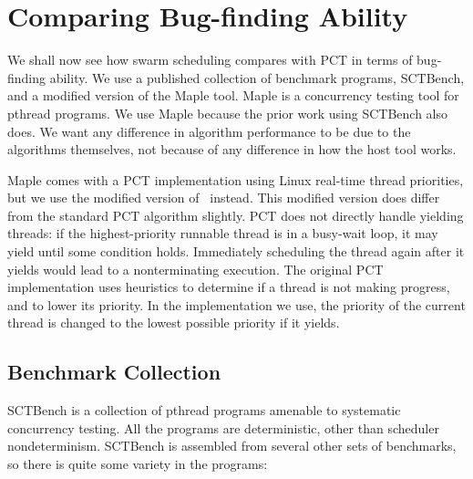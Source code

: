 \section{Comparing Bug-finding Ability}
\label{sec:algorithms-eval}

We shall now see how swarm scheduling compares with PCT in terms of bug-finding
ability.  We use a published collection of benchmark programs,
SCTBench\cite{thomson2016,thomson2014}, and a modified version of the Maple
tool\cite{yu2012}.  Maple is a concurrency testing tool for pthread programs.
We use Maple because the prior work using SCTBench also does.  We want any
difference in algorithm performance to be due to the algorithms themselves, not
because of any difference in how the host tool works.

Maple comes with a PCT implementation using Linux real-time thread priorities,
but we use the modified version of~\cite{thomson2016} instead.  This modified
version does differ from the standard PCT algorithm slightly.  PCT does not
directly handle yielding threads: if the highest-priority runnable thread is in
a busy-wait loop, it may yield until some condition holds.  Immediately
scheduling the thread again after it yields would lead to a nonterminating
execution.  The original PCT implementation uses heuristics to determine if a
thread is not making progress, and to lower its
priority\cite{burckhardt2010}. In the implementation we use, the priority of the
current thread is changed to the lowest possible priority if it
yields\cite{thomson2016}.

\subsection{Benchmark Collection}
\label{sec:algorithms-eval-sctbench}

SCTBench\cite{thomson2016,thomson2014} is a collection of pthread programs
amenable to systematic concurrency testing.  All the programs are deterministic,
other than scheduler nondeterminism.  SCTBench is assembled from several other
sets of benchmarks, so there is quite some variety in the programs:

